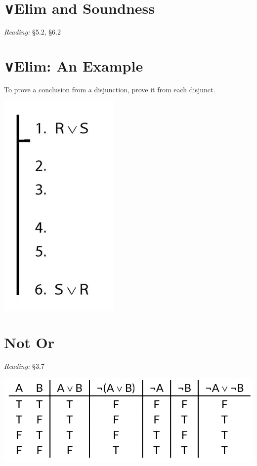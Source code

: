 \documentclass[12pt]{extarticle}
\begin{document}
\begin{multicols*}{3}
 
\section{∨Elim and Soundness}
 
\emph{Reading:} §5.2, §6.2
 
 
 
\section{∨Elim: An Example}
 
To prove a conclusion from a disjunction, prove it from each disjunct.
 
\begin{center}
\includegraphics[scale=0.3]{img/proof_disjunction_elim.png}
\end{center}
 
 
\section{Not Or}
 
\emph{Reading:} §3.7
 
\begin{center}
\includegraphics[scale=0.3]{img/tt_unit_603.png}
\end{center}
 

\end{multicols*}
\end{document}
